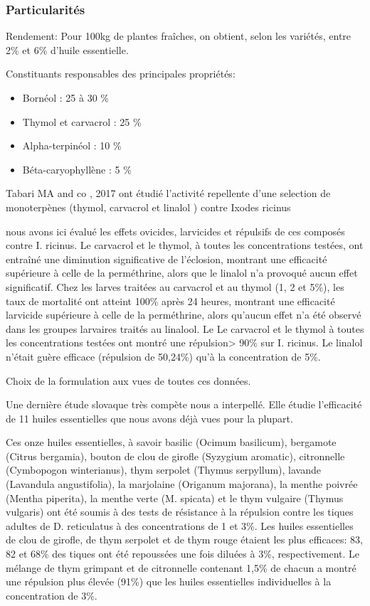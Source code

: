 \documentclass[12pt,a4wide]{article}
\begin{document}
\subsubsection{Particularités}
\label{sec-4-11-3}

Rendement: Pour 100kg de plantes fraîches, on obtient, selon les variétés, entre 2\% et 6\% d'huile essentielle.

Constituants responsables des principales propriétés:
\begin{itemize}
\item Bornéol : 25 à 30 \%
\item Thymol et carvacrol : 25 \%
\item Alpha-terpinéol : 10 \%
\item Béta-caryophyllène : 5 \%
\end{itemize}

Tabari MA and co , 2017 ont étudié l'activité repellente d'une selection de monoterpènes (thymol, carvacrol et linalol ) contre Ixodes ricinus

nous avons ici évalué les effets ovicides, larvicides et répulsifs de ces composés contre I. ricinus. 
Le carvacrol et le thymol, à toutes les concentrations testées, ont entraîné une diminution significative de l'éclosion, montrant une efficacité supérieure à celle de la perméthrine, alors que le linalol n'a provoqué aucun effet significatif. Chez les larves traitées au carvacrol et au thymol (1, 2 et 5\%), les taux de mortalité ont atteint 100\% après 24 heures, montrant une efficacité larvicide supérieure à celle de la perméthrine, alors qu'aucun effet n'a été observé dans les groupes larvaires traités au linalool. Le 
Le carvacrol et le thymol à toutes les concentrations testées ont montré une répulsion> 90\% sur I. ricinus. Le linalol n'était guère efficace (répulsion de 50,24\%) qu'à la concentration de 5\%. 




Choix de la formulation aux vues de toutes ces données.

Une dernière étude slovaque très compète nous a interpellé. Elle étudie l'efficacité de 11 huiles essentielles que nous avons déjà vues pour la plupart.


Ces onze huiles essentielles, à savoir basilic (Ocimum basilicum), bergamote (Citrus bergamia), bouton de clou de girofle (Syzygium aromatic), citronnelle (Cymbopogon winterianus), thym serpolet (Thymus serpyllum), lavande (Lavandula angustifolia), la marjolaine (Origanum majorana), la menthe poivrée (Mentha piperita), la menthe verte (M. spicata) et le thym vulgaire (Thymus vulgaris) ont été soumis à des tests de résistance à la répulsion contre les tiques adultes de D. reticulatus à des concentrations de 1 et 3\%. Les huiles essentielles de clou de girofle, de thym serpolet et de thym rouge étaient les plus efficaces: 83, 82 et 68\% des tiques ont été repoussées une fois diluées à 3\%, respectivement. Le mélange de thym grimpant et de citronnelle contenant 1,5\% de chacun a montré une répulsion plus élevée (91\%) que les huiles essentielles individuelles à la concentration de 3\%.
\end{document}
